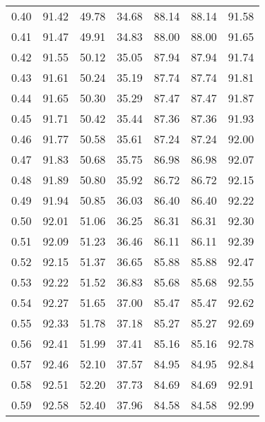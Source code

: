 \begin{tabular}{|c|c|c|c|c|c|c|}
      0.40 &     91.42 &     49.78 &      34.68 &   88.14 &      88.14 &         91.58 \\
      0.41 &     91.47 &     49.91 &      34.83 &   88.00 &      88.00 &         91.65 \\
      0.42 &     91.55 &     50.12 &      35.05 &   87.94 &      87.94 &         91.74 \\
      0.43 &     91.61 &     50.24 &      35.19 &   87.74 &      87.74 &         91.81 \\
      0.44 &     91.65 &     50.30 &      35.29 &   87.47 &      87.47 &         91.87 \\
      0.45 &     91.71 &     50.42 &      35.44 &   87.36 &      87.36 &         91.93 \\
      0.46 &     91.77 &     50.58 &      35.61 &   87.24 &      87.24 &         92.00 \\
      0.47 &     91.83 &     50.68 &      35.75 &   86.98 &      86.98 &         92.07 \\
      0.48 &     91.89 &     50.80 &      35.92 &   86.72 &      86.72 &         92.15 \\
      0.49 &     91.94 &     50.85 &      36.03 &   86.40 &      86.40 &         92.22 \\
      0.50 &     92.01 &     51.06 &      36.25 &   86.31 &      86.31 &         92.30 \\
      0.51 &     92.09 &     51.23 &      36.46 &   86.11 &      86.11 &         92.39 \\
      0.52 &     92.15 &     51.37 &      36.65 &   85.88 &      85.88 &         92.47 \\
      0.53 &     92.22 &     51.52 &      36.83 &   85.68 &      85.68 &         92.55 \\
      0.54 &     92.27 &     51.65 &      37.00 &   85.47 &      85.47 &         92.62 \\
      0.55 &     92.33 &     51.78 &      37.18 &   85.27 &      85.27 &         92.69 \\
      0.56 &     92.41 &     51.99 &      37.41 &   85.16 &      85.16 &         92.78 \\
      0.57 &     92.46 &     52.10 &      37.57 &   84.95 &      84.95 &         92.84 \\
      0.58 &     92.51 &     52.20 &      37.73 &   84.69 &      84.69 &         92.91 \\
      0.59 &     92.58 &     52.40 &      37.96 &   84.58 &      84.58 &         92.99 \\

\end{tabular}
